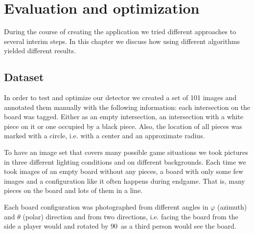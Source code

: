
\chapter{Evaluation and optimization}
	\label{evaluation}
	During the course of creating the application we tried different approaches to several interim steps. In this chapter we discuss how using different algorithms yielded different results.

	\section{Dataset}
	\label{evaluation-dataset}
	In order to test and optimize our detector we created a set of 101 images and annotated them manually with the following information: each intersection on the board was tagged. Either as an empty intersection, an intersection with a white piece on it or one occupied by a black piece. Also, the location of all pieces was marked with a circle, i.e. with a center and an approximate radius.

	To have an image set that covers many possible game situations we took pictures in three different lighting conditions and on different backgrounds. Each time we took images of an empty board without any pieces, a board with only some few images and a configuration like it often happens during endgame. That is, many pieces on the board and lots of them in a line.

	Each board configuration was photographed from different angles in $\varphi$ (azimuth) and $\theta$ (polar) direction and from two directions, i.e. facing the board from the side a player would and rotated by 90\textdegree\ as a third person would see the board.

